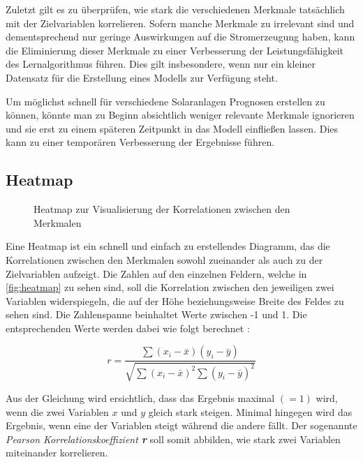 \documentclass[12pt, a4paper]{article}
\begin{document}
Zuletzt gilt es zu überprüfen, wie stark die verschiedenen Merkmale tatsächlich mit der Zielvariablen korrelieren. Sofern manche Merkmale zu irrelevant sind und dementsprechend nur geringe Auswirkungen auf die Stromerzeugung haben, kann die Eliminierung dieser Merkmale zu einer Verbesserung der Leistungsfähigkeit des Lernalgorithmus führen. Dies gilt insbesondere, wenn nur ein kleiner Datensatz für die Erstellung eines Modells zur Verfügung steht. 

Um möglichst schnell für verschiedene Solaranlagen Prognosen erstellen zu können, könnte man zu Beginn absichtlich weniger relevante Merkmale ignorieren und sie erst zu einem späteren Zeitpunkt in das Modell einfließen lassen. Dies kann zu einer temporären Verbesserung der Ergebnisse führen.

\subsection{Heatmap}

\begin{figure}[H]
\centering
\def\svgwidth{375pt}

\caption{Heatmap zur Visualisierung der Korrelationen zwischen den Merkmalen}
\label{fig:heatmap}
\end {figure}

Eine Heatmap ist ein schnell und einfach zu erstellendes Diagramm, das die Korrelationen zwischen den Merkmalen sowohl zueinander als auch zu der Zielvariablen aufzeigt. Die Zahlen auf den einzelnen Feldern, welche in \autoref{fig:heatmap} zu sehen sind, soll die Korrelation zwischen den jeweiligen zwei Variablen widerspiegeln, die auf der Höhe beziehungsweise Breite des Feldes zu sehen sind. Die Zahlenspanne beinhaltet Werte zwischen -1 und 1. Die entsprechenden Werte werden dabei wie folgt berechnet \cite{ws:vitalflux}:

\begin{equation}
r=\frac{\sum(x_i - \bar{x})(y_i - \bar{y})}
{\sqrt{\sum(x_i - \bar{x})^2\sum(y_i -  \bar{y})^2}}
\end{equation}


Aus der Gleichung wird ersichtlich, dass das Ergebnis maximal $(=1)$ wird, wenn die zwei Variablen $x$ und $y$ gleich stark steigen. Minimal hingegen wird das Ergebnis, wenn eine der Variablen steigt während die andere fällt. Der sogenannte \textit{Pearson Korrelationskoeffizient \textbf{r}} soll somit abbilden, wie stark zwei Variablen miteinander korrelieren. 
\end{document}
